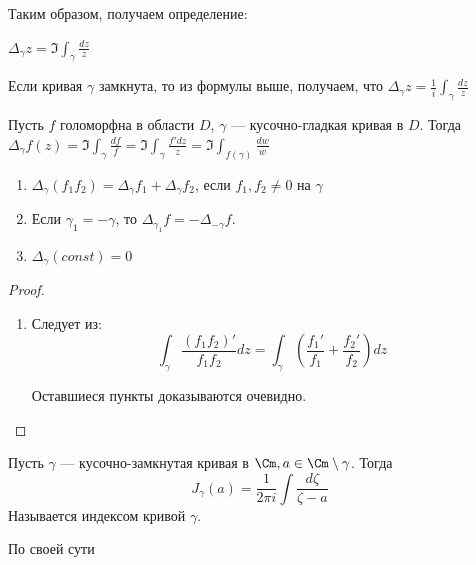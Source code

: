 Таким образом, получаем определение:

\begin{definition}
    \(\Delta_\gamma z = \Im \int_\gamma \frac{dz}{z}\)
\end{definition}

\begin{note}
    Если кривая \(\gamma\) замкнута, то из формулы выше, получаем, что \(\Delta_\gamma z = \frac{1}{i} \int_\gamma \frac{dz}{z}\)
\end{note}

\begin{definition}
    Пусть \(f\) голоморфна в области \(D\), \(\gamma\) --- кусочно-гладкая кривая в \(D\). Тогда \(\Delta_\gamma f(z) = \Im \int_\gamma \frac{df}{f} = \Im \int_\gamma \frac{f'dz}{z} = \Im \int_{f(\gamma)}\frac{dw}{w}\)
\end{definition}

\begin{proposition}
    \begin{enumerate}
        \item \(\Delta_\gamma (f_1f_2) = \Delta_\gamma f_1 + \Delta_\gamma f_2\), если \(f_1, f_2 \ne 0\) на \(\gamma\)
        \item Если \(\gamma_1 = -\gamma\), то \(\Delta_{\gamma_1} f = -\Delta_{-\gamma} f\).
        \item \(\Delta_\gamma(const) = 0\)
    \end{enumerate}
\end{proposition}
\begin{proof}
    \begin{enumerate}
        \item Следует из:
        \[\int_\gamma \frac{(f_1f_2)'}{f_1f_2}dz = \int_\gamma \left( \frac{f_1'}{f_1} + \frac{f_2'}{f_2} \right)dz\]
        
        Оставшиеся пункты доказываются очевидно.
    \end{enumerate}
\end{proof}


\begin{definition}
    Пусть \(\gamma\) --- кусочно-замкнутая кривая в \(\Cm, a \in \Cm \setminus \gamma\). Тогда 
    \[J_\gamma(a) = \frac{1}{2\pi i}\int \frac{d\zeta}{\zeta - a}\]
    Называется индексом кривой \(\gamma\).
\end{definition}

\begin{note}
    По своей сути \(\)
\end{note}

